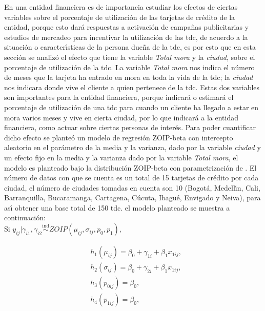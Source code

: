 En una entidad financiera es de importancia estudiar los efectos de ciertas variables sobre el porcentaje de utilizaci\'{o}n de las tarjetas de cr\'{e}dito de la entidad, porque esto dar\'{a} respuestas a activaci\'{o}n de campa\~{n}as publicitarias y estudios de mercadeo para incentivar la utilizaci\'{o}n de las tdc, de acuerdo a la situaci\'{o}n o caracter\'{\i}sticas de la persona due\~{n}a de la tdc, es por esto que en esta secci\'{o}n se analiz\'{o} el efecto que tiene la variable \textsl{Total mora} y la \textsl{ciudad}, sobre el porcentaje de utilizaci\'{o}n de la tdc. La variable \textsl{Total mora} nos indica el n\'{u}mero de meses que la tarjeta ha entrado en mora en toda la vida de la tdc; la \textsl{ciudad} nos indicara donde vive el cliente a quien pertenece de la tdc. Estas dos variables son importantes para la entidad financiera, porque indicar\'{a} o estimar\'{a} el porcentaje de utilizaci\'{o}n de una tdc para cuando un cliente ha llegado a estar en mora varios meses y vive en cierta ciudad, por lo que indicar\'{a} a la entidad financiera, como actuar sobre ciertas personas de inter\'{e}s. Para poder cuantificar dicho efecto se plante\'{o} un modelo de regresi\'{o}n ZOIP-beta con intercepto aleatorio en el par\'{a}metro de la media y la varianza, dado por la variable \textsl{ciudad} y un efecto fijo en la media y la varianza dado por la variable \textsl{Total mora}, el modelo es planteado bajo la distribuci\'{o}n ZOIP-beta con parametrizaci\'{o}n de \cite{Stasinopoulos2}. El n\'{u}mero de datos con que se cuenta es un total de 15 tarjetas de cr\'{e}dito por cada ciudad, el n\'{u}mero de ciudades tomadas en cuenta son 10 (Bogot\'{a}, Medell\'{\i}n, Cali, Barranquilla, Bucaramanga, Cartagena, C\'{u}cuta, Ibagu\'{e}, Envigado y Neiva), para as\'{\i} obtener una base total de 150 tdc. el modelo planteado se muestra a continuaci\'{o}n:\\

Si $y_{ij}| \gamma_{i1},\gamma_{i2} \overset{\text{ind}}{\sim} ZOIP(\mu_{ij},\sigma_{ij},p_0, p_1),$

\begin{equation}
\begin{split}
&h_1(\mu_{ij})=\beta_0+\gamma_{1i}+\beta_1 x_{1ij},\\
&h_2(\sigma_{ij})=\beta_0+\gamma_{2i}+\beta_1 x_{1ij},\\
&h_3(p_{0ij})=\beta_0,\\
&h_4(p_{1ij}) =\beta_0,
\end{split}
\label{A_eq_reg_mix}
\end{equation}

